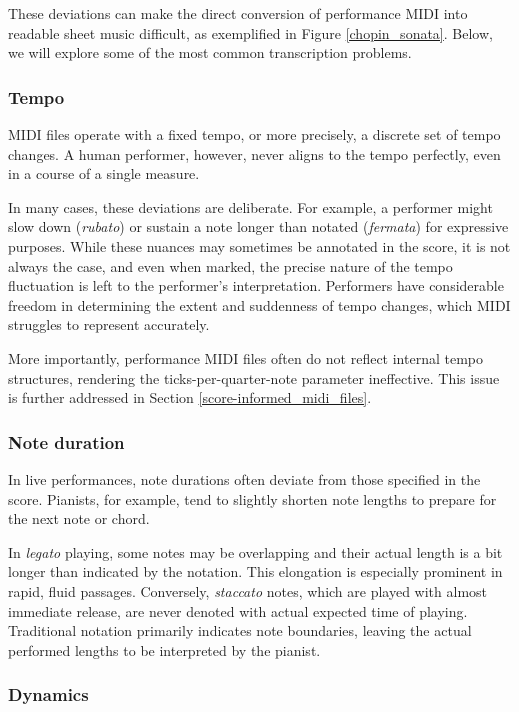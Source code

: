 These deviations can make the direct conversion of performance MIDI into readable sheet music difficult, as exemplified in Figure \ref{chopin_sonata}. Below, we will explore some of the most common transcription problems.

\subsubsection{Tempo}

MIDI files operate with a fixed tempo, or more precisely, a discrete set of tempo changes. A human performer, however, never aligns to the tempo perfectly, even in a course of a single measure.

In many cases, these deviations are deliberate. For example, a performer might slow down (\emph{rubato}) or sustain a note longer than notated (\emph{fermata}) for expressive purposes. While these nuances may sometimes be annotated in the score, it is not always the case, and even when marked, the precise nature of the tempo fluctuation is left to the performer’s interpretation. Performers have considerable freedom in determining the extent and suddenness of tempo changes, which MIDI struggles to represent accurately.

More importantly, performance MIDI files often do not reflect internal tempo structures, rendering the ticks-per-quarter-note parameter ineffective. This issue is further addressed in Section \ref{score-informed_midi_files}.

\subsubsection{Note duration}

In live performances, note durations often deviate from those specified in the score. Pianists, for example, tend to slightly shorten note lengths to prepare for the next note or chord.

In \emph{legato} playing, some notes may be overlapping and their actual length is a bit longer than indicated by the notation. This elongation is especially prominent in rapid, fluid passages. Conversely, \emph{staccato} notes, which are played with almost immediate release, are never denoted with actual expected time of playing. Traditional notation primarily indicates note boundaries, leaving the actual performed lengths to be interpreted by the pianist.

\subsubsection{Dynamics}

